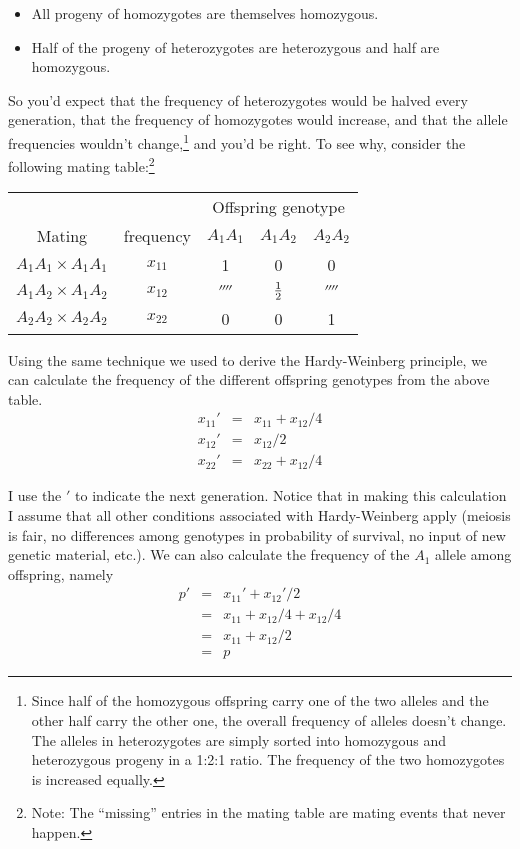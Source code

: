 \documentclass[12pt]{article}
\begin{document}
\begin{itemize}

\item All progeny of homozygotes are themselves homozygous.

\item Half of the progeny of heterozygotes are heterozygous and half
are homozygous.

\end{itemize}
So you'd expect that the frequency of heterozygotes would be halved
every generation, that the frequency of homozygotes would increase,
and that the allele frequencies wouldn't change,\footnote{Since half
  of the homozygous offspring carry one of the two alleles and the
  other half carry the other one, the overall frequency of alleles
  doesn't change. The alleles in heterozygotes are simply sorted into
  homozygous and heterozygous progeny in a 1:2:1 ratio. The frequency
  of the two homozygotes is increased equally.} and you'd be right. To
see why, consider the following mating table:\footnote{Note: The
  ``missing'' entries in the mating table are mating events that never
  happen.}

\begin{center}
\begin{tabular}{ccccc}
\hline\hline
&&\multicolumn{3}{c}{Offspring genotype} \\
Mating & frequency & $A_1A_1$ & $A_1A_2$ & $A_2A_2$ \\
\hline
$A_1A_1 \times A_1A_1$ & $x_{11}$ & 1 & 0 & 0 \\
$A_1A_2 \times A_1A_2$ & $x_{12}$ & $\fourth$ & $\frac{1}{2}$ & $\fourth$ \\
$A_2A_2 \times A_2A_2$ & $x_{22}$ & 0 & 0 & 1 \\
\hline
\end{tabular}
\end{center}

\noindent Using the same technique we used to derive the
Hardy-Weinberg principle, we can calculate the frequency of the
different offspring genotypes from the above table.
\begin{eqnarray}
x_{11}' &=& x_{11} + x_{12}/4 \\
x_{12}' &=& x_{12}/2 \\
x_{22}' &=& x_{22} + x_{12}/4
\end{eqnarray}

\noindent I use the $'$ to indicate the next generation. Notice that
in making this calculation I assume that all other conditions
associated with Hardy-Weinberg apply (meiosis is fair, no differences
among genotypes in probability of survival, no input of new genetic
material, etc.). We can also calculate the frequency of the $A_1$
allele among offspring, namely
\begin{eqnarray}
p' &=& x_{11}' + x_{12}'/2 \\
   &=& x_{11} + x_{12}/4 + x_{12} /4 \\
   &=& x_{11} + x_{12}/2 \\
   &=& p
\end{eqnarray}
\end{document}

